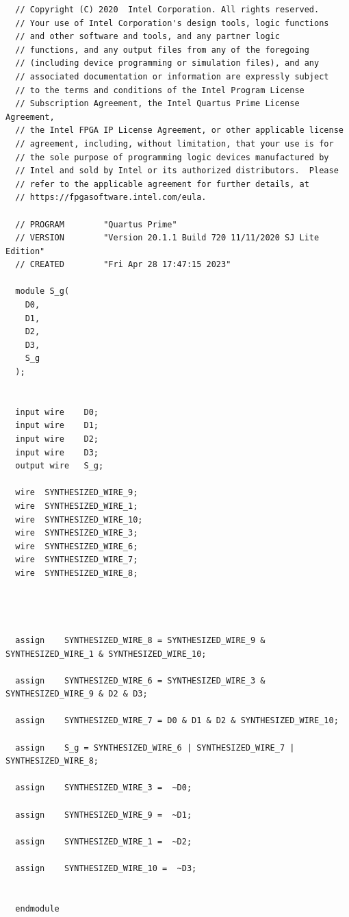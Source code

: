 \documentclass{article}
\begin{document}
\begin{lstlisting}
  // Copyright (C) 2020  Intel Corporation. All rights reserved.
  // Your use of Intel Corporation's design tools, logic functions 
  // and other software and tools, and any partner logic 
  // functions, and any output files from any of the foregoing 
  // (including device programming or simulation files), and any 
  // associated documentation or information are expressly subject 
  // to the terms and conditions of the Intel Program License 
  // Subscription Agreement, the Intel Quartus Prime License Agreement,
  // the Intel FPGA IP License Agreement, or other applicable license
  // agreement, including, without limitation, that your use is for
  // the sole purpose of programming logic devices manufactured by
  // Intel and sold by Intel or its authorized distributors.  Please
  // refer to the applicable agreement for further details, at
  // https://fpgasoftware.intel.com/eula.
  
  // PROGRAM		"Quartus Prime"
  // VERSION		"Version 20.1.1 Build 720 11/11/2020 SJ Lite Edition"
  // CREATED		"Fri Apr 28 17:47:15 2023"
  
  module S_g(
    D0,
    D1,
    D2,
    D3,
    S_g
  );
  
  
  input wire	D0;
  input wire	D1;
  input wire	D2;
  input wire	D3;
  output wire	S_g;
  
  wire	SYNTHESIZED_WIRE_9;
  wire	SYNTHESIZED_WIRE_1;
  wire	SYNTHESIZED_WIRE_10;
  wire	SYNTHESIZED_WIRE_3;
  wire	SYNTHESIZED_WIRE_6;
  wire	SYNTHESIZED_WIRE_7;
  wire	SYNTHESIZED_WIRE_8;
  
  
  
  
  assign	SYNTHESIZED_WIRE_8 = SYNTHESIZED_WIRE_9 & SYNTHESIZED_WIRE_1 & SYNTHESIZED_WIRE_10;
  
  assign	SYNTHESIZED_WIRE_6 = SYNTHESIZED_WIRE_3 & SYNTHESIZED_WIRE_9 & D2 & D3;
  
  assign	SYNTHESIZED_WIRE_7 = D0 & D1 & D2 & SYNTHESIZED_WIRE_10;
  
  assign	S_g = SYNTHESIZED_WIRE_6 | SYNTHESIZED_WIRE_7 | SYNTHESIZED_WIRE_8;
  
  assign	SYNTHESIZED_WIRE_3 =  ~D0;
  
  assign	SYNTHESIZED_WIRE_9 =  ~D1;
  
  assign	SYNTHESIZED_WIRE_1 =  ~D2;
  
  assign	SYNTHESIZED_WIRE_10 =  ~D3;
  
  
  endmodule
   
\end{lstlisting}
\end{document}
